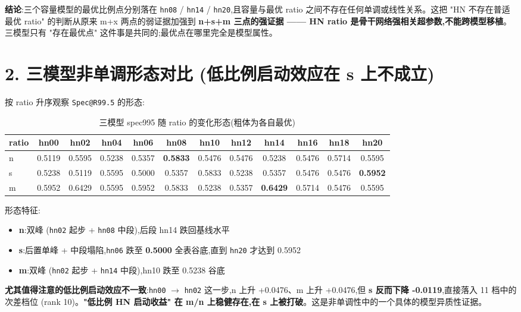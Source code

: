 \documentclass[UTF8,12pt,a4paper]{ctexart}
\begin{document}
\textbf{结论}:三个容量模型的最优比例点分别落在 \texttt{hn08} / \texttt{hn14} / \texttt{hn20},且容量与最优 ratio 之间不存在任何单调或线性关系。这把 "HN 不存在普适最优 ratio" 的判断从原来 m+x 两点的弱证据加强到 \textbf{n+s+m 三点的强证据 —— HN ratio 是骨干网络强相关超参数,不能跨模型移植}。三模型只有 "存在最优点" 这件事是共同的;最优点在哪里完全是模型属性。

\bigskip
\section*{2. 三模型非单调形态对比 \mdseries (低比例启动效应在 s 上不成立)}

按 ratio 升序观察 \texttt{Spec@R99.5} 的形态:

\begin{table}[h]
\centering
\caption{三模型 spec995 随 ratio 的变化形态(粗体为各自最优)}
\small
\begin{tabular}{lccccccccccc}
\toprule
ratio & hn00 & hn02 & hn04 & hn06 & hn08 & hn10 & hn12 & hn14 & hn16 & hn18 & hn20 \\
\midrule
n & 0.5119 & 0.5595 & 0.5238 & 0.5357 & \textbf{0.5833} & 0.5476 & 0.5476 & 0.5238 & 0.5476 & 0.5714 & 0.5595 \\
s & 0.5238 & 0.5119 & 0.5595 & 0.5000 & 0.5357 & 0.5833 & 0.5238 & 0.5357 & 0.5476 & 0.5476 & \textbf{0.5952} \\
m & 0.5952 & 0.6429 & 0.5595 & 0.5952 & 0.5833 & 0.5238 & 0.5357 & \textbf{0.6429} & 0.5714 & 0.5476 & 0.5595 \\
\bottomrule
\end{tabular}
\end{table}

形态特征:
\begin{itemize}[leftmargin=*,itemsep=2pt]
    \item \textbf{n}:双峰 (\texttt{hn02} 起步 + \texttt{hn08} 中段),后段 hn14 跌回基线水平
    \item \textbf{s}:后置单峰 + 中段塌陷,\texttt{hn06} 跌至 \textbf{0.5000} 全表谷底,直到 \texttt{hn20} 才达到 0.5952
    \item \textbf{m}:双峰 (\texttt{hn02} 起步 + \texttt{hn14} 中段),hn10 跌至 0.5238 谷底
\end{itemize}

\textbf{尤其值得注意的低比例启动效应不一致}:\texttt{hn00} \(\rightarrow\) \texttt{hn02} 这一步,n 上升 +0.0476、m 上升 +0.0476,但 \textbf{s 反而下降 -0.0119},直接落入 11 档中的次差档位 (rank 10)。\textbf{"低比例 HN 启动收益" 在 m/n 上稳健存在,在 s 上被打破}。这是非单调性中的一个具体的模型异质性证据。
\end{document}
